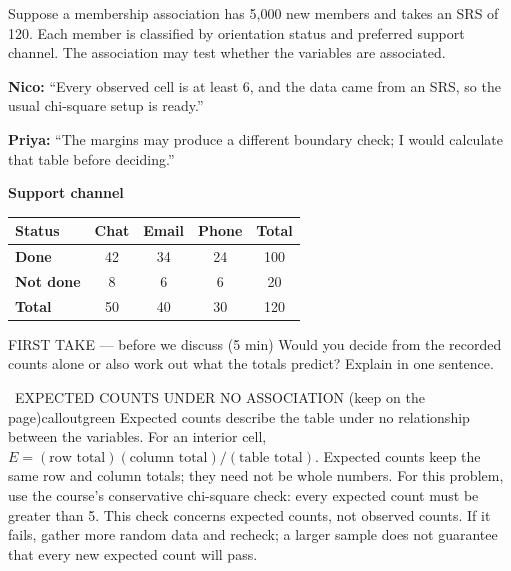 \documentclass[11pt]{article}
\begin{document}


Suppose a membership association has 5,000 new members and takes an SRS of 120. Each member is classified by orientation status and preferred support channel. The association may test whether the variables are associated.\par\smallskip \textbf{Nico:} ``Every observed cell is at least 6, and the data came from an SRS, so the usual chi-square setup is ready.''\par \textbf{Priya:} ``The margins may produce a different boundary check; I would calculate that table before deciding.''\par
\begin{center}
\textbf{Support channel}\par\smallskip
\begin{tabular}{|l|c|c|c|c|}
\hline
\textbf{Status} & \textbf{Chat} & \textbf{Email} & \textbf{Phone} & \textbf{Total} \\ \hline
\textbf{Done} & 42 & 34 & 24 & 100 \\ \hline
\textbf{Not done} & 8 & 6 & 6 & 20 \\ \hline
\textbf{Total} & 50 & 40 & 30 & 120 \\ \hline
\end{tabular}
\end{center}
\begin{firsttakebox}{FIRST TAKE --- before we discuss (5 min)}
Would you decide from the recorded counts alone or also work out what the totals predict? Explain in one sentence.
\workspace{0.9in}
\end{firsttakebox}

\begin{callout}{\IconBook\ EXPECTED COUNTS UNDER NO ASSOCIATION (keep on the page)}{calloutgreen}
Expected counts describe the table under no relationship between the variables.
For an interior cell, $E=(\text{row total})(\text{column total})/(\text{table total})$.
Expected counts keep the same row and column totals; they need not be whole numbers.
For this problem, use the course's conservative chi-square check: every expected count must be
greater than 5. This check concerns expected counts, not observed counts. If it fails, gather more
random data and recheck; a larger sample does not guarantee that every new expected count will pass.
\end{callout}
\end{document}
